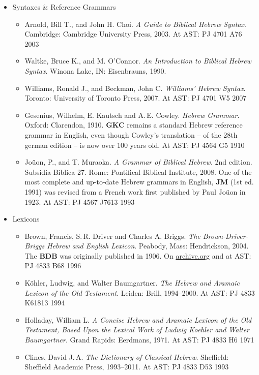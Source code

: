 \documentclass[titlepage]{article}
\begin{document}
\begin{itemize}
  \item Syntaxes \& Reference Grammars

    \begin{itemize}
      \item
      	Arnold, Bill T., and John H. Choi. \emph{A Guide to Biblical Hebrew Syntax}.
      	Cambridge: Cambridge University Press, 2003. At AST: PJ 4701 A76 2003
      \item
      	Waltke, Bruce K., and M. O’Connor. \emph{An Introduction to Biblical Hebrew Syntax}.
      	Winona Lake, IN: Eisenbrauns, 1990.
      \item
        Williams, Ronald J., and  Beckman, John C. \emph{Williams' Hebrew Syntax}.
        Toronto: University of Toronto Press, 2007. At AST: PJ 4701 W5 2007
      \item
        Gesenius, Wilhelm, E. Kautsch and A.\,E. Cowley. \emph{Hebrew Grammar}.
        Oxford: Clarendon, 1910. \textbf{GKC} remains a standard Hebrew
        reference grammar in English, even though Cowley's translation
        -- of the 28th german edition -- is now over 100 years old. At
        AST: PJ 4564 G5 1910
      \item
      	Joüon, P., and T. Muraoka. \emph{A Grammar of Biblical Hebrew}.
      	2nd edition. Subsidia Biblica 27. Rome: Pontifical Biblical
      	Institute, 2008. One of the most complete and up-to-date
      	Hebrew grammars in English, \textbf{JM} (1st ed. 1991) was
      	revised from a French work first published by Paul Joüon in
      	1923. At AST: PJ 4567 J7613 1993
    \end{itemize}

  \item Lexicons

    \begin{itemize}
      \item
        Brown, Francis, S.\,R. Driver and Charles A. Briggs. \emph{The
        Brown-Driver-Briggs Hebrew and English Lexicon}. Peabody, Mass:
        Hendrickson, 2004. The \textbf{BDB} was originally published in 1906.
        On \href{https://archive.org/details/hebrewenglishlex00geseuoft}{archive.org}
        and at AST: PJ 4833 B68 1996
      \item
        Köhler, Ludwig, and Walter Baumgartner. \emph{The Hebrew
        and Aramaic Lexicon of the Old Testament}. Leiden: Brill,
        1994--2000.
        At AST: PJ 4833 K61813 1994
      \item
        Holladay, William L. \emph{A Concise Hebrew and Aramaic Lexicon
        of the Old Testament, Based Upon the Lexical Work of Ludwig
        Koehler and Walter Baumgartner}.
        Grand Rapids: Eerdmans, 1971.
        At AST: PJ 4833 H6 1971
      \item
        Clines, David J.\,A. \emph{The Dictionary of Classical Hebrew}.
        Sheffield: Sheffield Academic Press, 1993--2011.
        At AST: PJ 4833 D53 1993
    \end{itemize}

\end{itemize}
\end{document}
